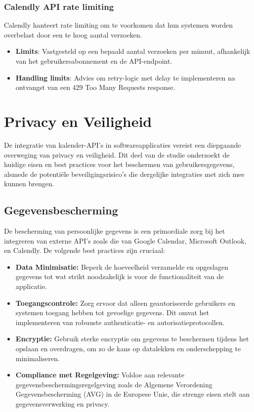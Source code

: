 \subsubsection{Calendly API rate limiting}

Calendly hanteert rate limiting om te voorkomen dat hun systemen worden overbelast door een te hoog aantal verzoeken.
\begin{itemize}
    \item \textbf{Limits}: Vastgesteld op een bepaald aantal verzoeken per minuut, afhankelijk van het gebruikersabonnement en de API-endpoint.
    \item \textbf{Handling limits}: Advies om retry-logic met delay te implementeren na ontvangst van een 429 Too Many Requests response.
\end{itemize}


\section{Privacy en Veiligheid}

De integratie van kalender-API's in softwareapplicaties vereist een diepgaande overweging van privacy en veiligheid. Dit deel van de studie onderzoekt de huidige eisen en best practices voor het beschermen van gebruikersgegevens, alsmede de potentiële beveiligingsrisico's die dergelijke integraties met zich mee kunnen brengen.

\subsection{Gegevensbescherming}

De bescherming van persoonlijke gegevens is een primordiale zorg bij het integreren van externe API's zoals die van Google Calendar, Microsoft Outlook, en Calendly. De volgende best practices zijn cruciaal:

\begin{itemize}
    \item \textbf{Data Minimisatie:} Beperk de hoeveelheid verzamelde en opgeslagen gegevens tot wat strikt noodzakelijk is voor de functionaliteit van de applicatie.
    \item \textbf{Toegangscontrole:} Zorg ervoor dat alleen geautoriseerde gebruikers en systemen toegang hebben tot gevoelige gegevens. Dit omvat het implementeren van robuuste authenticatie- en autorisatieprotocollen.
    \item \textbf{Encryptie:} Gebruik sterke encryptie om gegevens te beschermen tijdens het opslaan en overdragen, om zo de kans op datalekken en onderschepping te minimaliseren.
    \item \textbf{Compliance met Regelgeving:} Voldoe aan relevante gegevensbeschermingsregelgeving zoals de Algemene Verordening Gegevensbescherming (AVG) in de Europese Unie, die strenge eisen stelt aan gegevensverwerking en privacy.
\end{itemize}

